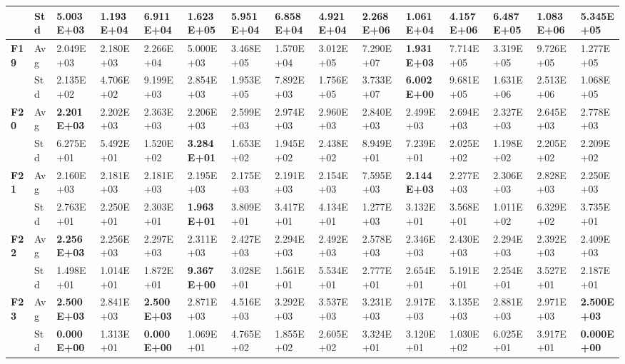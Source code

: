 \documentclass{article} %
\begin{document}
\begin{tabular}{|p{0.2in}|p{0.2in}|p{0.4in}|p{0.4in}|p{0.4in}|p{0.4in}|p{0.4in}|p{0.4in}|p{0.4in}|p{0.4in}|p{0.4in}|p{0.4in}|p{0.4in}|p{0.4in}|p{0.4in}|}
\textbf{} & Std & \textbf{5.003E+03} & 1.193E+04 & 6.911E+04 & 1.623E+05 & 5.951E+04 & 6.858E+04 & 4.921E+04 & 2.268E+06 & 1.061E+04 & 4.157E+06 & 6.487E+05 & 1.083E+06 & 5.345E+05 \\ \hline 
\textbf{F19} & Avg & 2.049E+03 & 2.180E+03 & 2.266E+04 & 5.000E+03 & 3.468E+05 & 1.570E+04 & 3.012E+05 & 7.290E+07 & \textbf{1.931E+03} & 7.714E+05 & 3.319E+05 & 9.726E+05 & 1.277E+05 \\ \hline 
\textbf{} & Std & 2.135E+02 & 4.706E+02 & 9.199E+03 & 2.854E+03 & 1.953E+05 & 7.892E+03 & 1.756E+05 & 3.733E+07 & \textbf{6.002E+00} & 9.681E+05 & 1.631E+06 & 2.513E+06 & 1.068E+05 \\ \hline 
\textbf{F20} & Avg & \textbf{2.201E+03} & 2.202E+03 & 2.363E+03 & 2.206E+03 & 2.599E+03 & 2.974E+03 & 2.960E+03 & 2.840E+03 & 2.499E+03 & 2.694E+03 & 2.327E+03 & 2.645E+03 & 2.778E+03 \\ \hline 
 & Std & 6.275E+01 & 5.492E+01 & 1.520E+02 & \textbf{3.284E+01} & 1.653E+02 & 1.945E+02 & 2.438E+02 & 8.949E+01 & 7.239E+01 & 2.025E+02 & 1.198E+02 & 2.205E+02 & 2.209E+02 \\ \hline 
\textbf{F21} & Avg\textbf{} & 2.160E+03 & 2.181E+03 & 2.181E+03 & 2.195E+03 & 2.175E+03 & 2.191E+03 & 2.154E+03 & 7.595E+03 & \textbf{2.144E+03} & 2.277E+03 & 2.306E+03 & 2.828E+03 & 2.250E+03 \\ \hline 
\textbf{} & Std\textbf{} & 2.763E+01 & 2.250E+01 & 2.303E+01 & \textbf{1.963E+01} & 3.809E+01 & 3.417E+01 & 4.134E+01 & 1.277E+03 & 3.132E+01 & 3.568E+01 & 1.011E+02 & 6.329E+02 & 3.735E+01 \\ \hline 
\textbf{F22} & Avg & \textbf{2.256E+03} & 2.256E+03 & 2.297E+03 & 2.311E+03 & 2.427E+03 & 2.294E+03 & 2.492E+03 & 2.578E+03 & 2.346E+03 & 2.430E+03 & 2.294E+03 & 2.392E+03 & 2.409E+03 \\ \hline 
\textbf{} & Std & 1.498E+01 & 1.014E+01 & 1.872E+01 & \textbf{9.367E+00} & 3.028E+01 & 1.561E+01 & 5.534E+01 & 2.777E+01 & 2.654E+01 & 5.191E+01 & 2.254E+01 & 3.527E+01 & 2.187E+01 \\ \hline 
\textbf{F23} & Avg & \textbf{2.500E+03} & 2.841E+03 & \textbf{2.500E+03} & 2.871E+03 & 4.516E+03 & 3.292E+03 & 3.537E+03 & 3.231E+03 & 2.917E+03 & 3.135E+03 & 2.881E+03 & 2.971E+03 & \textbf{2.500E+03} \\ \hline 
\textbf{} & Std & \textbf{0.000E+00} & 1.313E+01 & \textbf{0.000E+00} & 1.069E+01 & 4.765E+02 & 1.855E+02 & 2.605E+02 & 3.324E+01 & 3.120E+01 & 1.030E+02 & 6.025E+01 & 3.917E+01 & \textbf{0.000E+00} \\ \hline 

\end{tabular}
\end{document}
